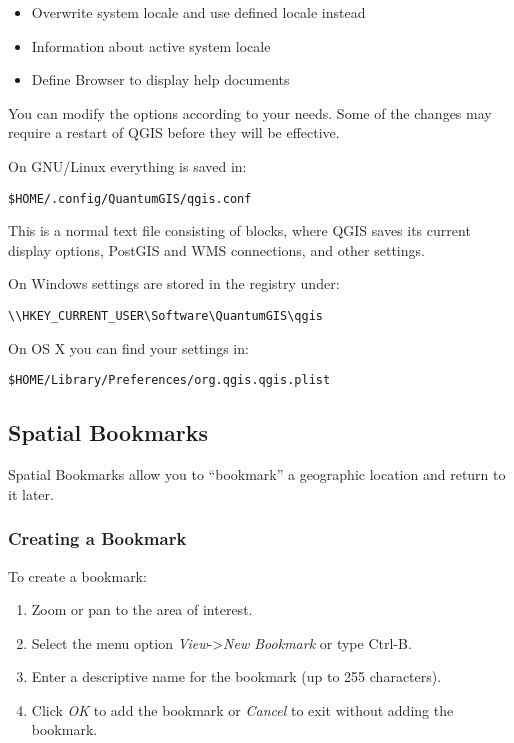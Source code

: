 
\begin{itemize}
\item Overwrite system locale and use defined locale instead
\item Information about active system locale
\end{itemize}


\begin{itemize}
\item Define Browser to display help documents
\end{itemize}


You can modify the options according to your needs. Some of the changes may 
require a restart of QGIS before they will be effective.

On GNU/Linux everything is saved in:
\begin{verbatim}
$HOME/.config/QuantumGIS/qgis.conf
\end{verbatim}
This is a normal text file consisting of blocks, where QGIS saves its current
display options, PostGIS and WMS connections, and other settings.

On Windows settings are stored in the registry under:
\begin{verbatim}
\\HKEY_CURRENT_USER\Software\QuantumGIS\qgis
\end{verbatim}

On OS X you can find your settings in:
\begin{verbatim}
$HOME/Library/Preferences/org.qgis.qgis.plist
\end{verbatim}


\subsection{Spatial Bookmarks}\label{sec:bookmarks}

Spatial Bookmarks allow you to ``bookmark'' a geographic location and return to it later.

\subsubsection{Creating a Bookmark}
To create a bookmark:
\begin{enumerate}
\item Zoom or pan to the area of interest.
\item Select the menu option \textit{View}->\textit{New Bookmark} or type Ctrl-B.
\item Enter a descriptive name for the bookmark (up to 255 characters).
\item Click \textit{OK} to add the bookmark or \textit{Cancel} to exit without adding the bookmark.
\end{enumerate}

